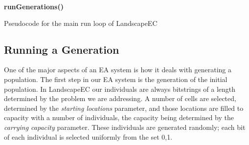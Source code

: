 \documentclass[12pt]{article}
\begin{document}

\begin{algorithm}[tb]
{\bf runGenerations()}
\caption{Pseudocode for the main run loop of LandscapeEC}
\label{alg:mainLoop}
\end{algorithm}

\label{sec:background}

\subsection{Running a Generation}
\label{sec:Running a Generation}

One of the major aspects of an EA system is how it deals with generating a population. The first step in our EA system is the generation of the initial population. In LandscapeEC our individuals are always bitstrings of a length determined by the problem we are addressing. A number of cells are selected, determined by the \emph{starting locations} parameter, and those locations are filled to capacity with a number of individuals, the capacity being determined by the \emph{carrying capacity} parameter. These individuals are generated randomly; each bit of each individual is selected uniformly from the set {0,1}.
\end{document}
